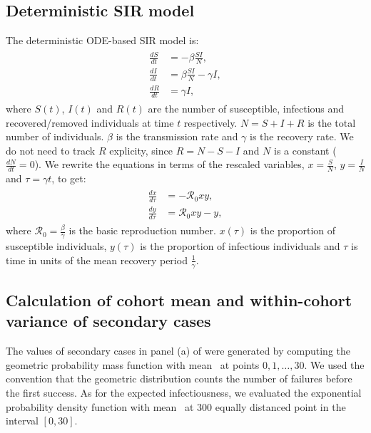 \subsection{Deterministic SIR model}
The deterministic ODE-based SIR model is:
\begin{align}
    \begin{split}
        \frac{dS}{dt} &= - \beta \frac{SI}{N}, \\
        \frac{dI}{dt} &= \beta \frac{SI}{N} - \gamma I, \\
        \frac{dR}{dt} &= \gamma I,
    \end{split}
\end{align}
where $S(t)$, $I(t)$ and $R(t)$ are the number of susceptible, infectious and recovered/removed individuals at time $t$ respectively. $N = S+I+R$ is the total number of individuals. $\beta$ is the transmission rate and $\gamma$ is the recovery rate. We do not need to track $R$ explicity, since $R = N-S-I$ and $N$ is a constant ($\frac{dN}{dt} = 0$). We rewrite the equations in terms of the rescaled variables, $x = \frac{S}{N}$, $y = \frac{I}{N}$ and $\tau = \gamma t$, to get:
\begin{align}
    \begin{split}
        \frac{dx}{d\tau} &= - \mathcal{R}_0 xy, \\
        \frac{dy}{d\tau} &= \mathcal{R}_0 xy - y,
    \end{split}
\end{align}
where $\mathcal{R}_0 = \frac{\beta}{\gamma}$ is the basic reproduction number. $x(\tau)$ is the proportion of susceptible individuals, $y(\tau)$ is the proportion of infectious individuals and $\tau$ is time in units of the mean recovery period $\frac{1}{\gamma}$.

\subsection{Calculation of cohort mean and within-cohort variance of secondary cases}
The values of secondary cases in panel (a) of  were generated by computing the geometric probability mass function  with mean \Ro~at points $0,1,\ldots,30$. We used the convention that the geometric distribution counts the number of failures before the first success.
As for the expected infectiousness, we evaluated
the exponential probability density function with mean \Ro~at $300$ equally distanced point in the interval $[0,30]$.

